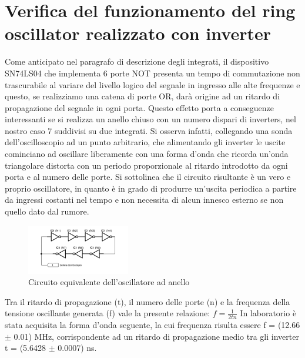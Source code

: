 \documentclass[journal]{IEEEtran}
\begin{document}
\section{Verifica del funzionamento del ring oscillator realizzato con inverter}
Come anticipato nel paragrafo di descrizione degli integrati, il dispositivo SN74LS04 che implementa 6 porte NOT presenta un tempo di commutazione non trascurabile al variare del livello logico del segnale in ingresso alle alte frequenze e questo, se realizziamo una catena di porte OR, darà origine ad un ritardo di propagazione del segnale in ogni porta. 
Questo effetto porta a conseguenze interessanti se si realizza un anello chiuso con un numero dispari di inverters, nel nostro caso 7 suddivisi su due integrati. Si osserva infatti, collegando una sonda dell'oscilloscopio ad un punto arbitrario, che alimentando gli inverter le uscite cominciano ad oscillare liberamente con una forma d'onda che ricorda un'onda triangolare distorta con un periodo proporzionale al ritardo introdotto da ogni porta e al numero delle porte. Si sottolinea che il circuito risultante è un vero e proprio oscillatore, in quanto è in grado di produrre un'uscita periodica a partire da ingressi costanti nel tempo e non necessita di alcun innesco esterno se non quello dato dal rumore.

\begin{figure}[H]%
\begin{center}
\includegraphics[width=0.40\textwidth]{sch-simulations/digital/output/ring-osc-logic.pdf}
\caption{Circuito equivalente dell'oscillatore ad anello}
\label{fig:circuit_ring_oscillator}
\end{center}
\end{figure}

Tra il ritardo di propagazione (t), il numero delle porte (n) e la frequenza della tensione oscillante generata (f) vale la presente relazione: 
\begin{math}
f = \frac{1}{2tn}
\end{math}
In laboratorio è stata acquisita la forma d'onda seguente, la cui frequenza risulta essere f = (12.66 $\pm$ 0.01) MHz, corrispondente ad un ritardo di propagazione medio tra gli inverter t = (5.6428 $\pm$ 0.0007) ns.
\end{document}
